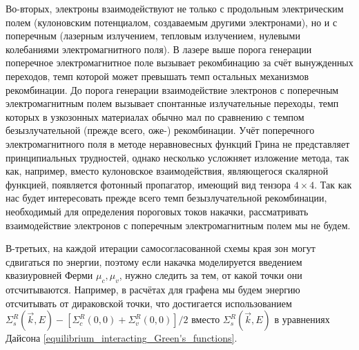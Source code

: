 Во-вторых, электроны взаимодействуют не только с продольным электрическим полем (кулоновским потенциалом, создаваемым другими электронами), но и с поперечным (лазерным излучением, тепловым излучением, нулевыми колебаниями электромагнитного поля). В лазере выше порога генерации поперечное электромагнитное поле вызывает рекомбинацию за счёт вынужденных переходов, темп которой может превышать темп остальных механизмов рекомбинации. До порога генерации взаимодействие электронов с поперечным электромагнитным полем вызывает спонтанные излучательные переходы, темп которых в узкозонных материалах обычно мал по сравнению с темпом безызлучательной (прежде всего, оже-) рекомбинации. Учёт поперечного электромагнитного поля в методе неравновесных функций Грина не представляет принципиальных трудностей, однако несколько усложняет изложение метода, так как, например, вместо кулоновское взаимодействия, являющегося скалярной функцией, появляется фотонный пропагатор, имеющий вид тензора $4\times4$. Так как нас будет интересовать прежде всего темп безызлучательной рекомбинации, необходимый для определения пороговых токов накачки, рассматривать взаимодействие электронов с поперечным электромагнитным полем мы не будем.

В-третьих, на каждой итерации самосогласованной схемы края зон могут сдвигаться по энергии, поэтому если накачка моделируется введением квазиуровней Ферми $\mu_c, \mu_v$, нужно следить за тем, от какой точки они отсчитываются. Например, в расчётах для графена мы будем энергию отсчитывать от дираковской точки, что достигается использованием $\Sigma^R_s(\vec{k},E) - [\Sigma^R_c(0,0) + \Sigma^R_v(0,0)]/2$ вместо $\Sigma^R_s(\vec{k},E)$ в уравнениях Дайсона \eqref{equilibrium_interacting_Green's_functions}.


